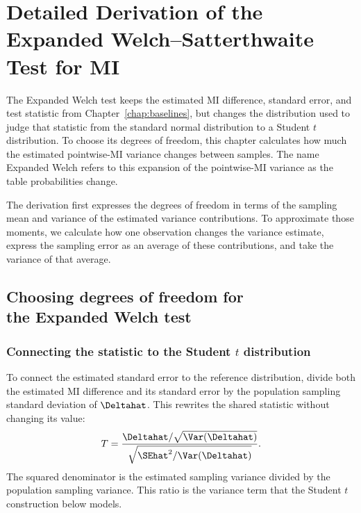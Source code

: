 \chapter{Detailed Derivation of the Expanded Welch--Satterthwaite Test for MI}
\label{chap:expanded}

The Expanded Welch test keeps the estimated MI difference, standard error, and test
statistic from Chapter~\ref{chap:baselines}, but changes the distribution used
to judge that statistic from the standard normal distribution to a Student
\(t\) distribution. To choose its degrees of freedom, this chapter calculates
how much the estimated pointwise-MI variance changes between samples. The name
Expanded Welch refers to this expansion of the pointwise-MI variance as the table
probabilities change.

The derivation first expresses the degrees of freedom in terms of the
sampling mean and variance of the estimated variance contributions. To
approximate those moments, we calculate how one observation changes the
variance estimate, express the sampling error as an average of these
contributions, and take the variance of that average.

\section[Choosing degrees of freedom for the Expanded Welch test]{Choosing degrees of
freedom for\\the Expanded Welch test}
\label{sec:component-df-choice}

\subsection{Connecting the statistic to the Student \texorpdfstring{\(t\)}{t} distribution}

To connect the estimated standard error to the reference distribution,
divide both the estimated MI difference and its standard error by the
population sampling standard deviation of \(\Deltahat\). This rewrites
the shared statistic without changing its value:
\begin{equation*}
  T
  =\frac{\Deltahat/\sqrt{\Var(\Deltahat)}}
         {\sqrt{\SEhat^2/\Var(\Deltahat)}}.
\end{equation*}
The squared denominator is the estimated sampling variance divided by
the population sampling variance. This ratio is the variance term that
the Student \(t\) construction below models.

